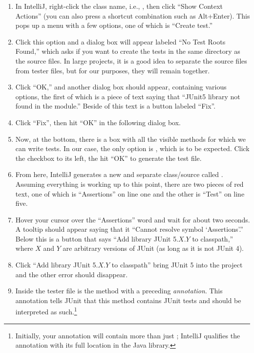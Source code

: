 \begin{enumerate}[label=(\arabic*)]
  \item In IntelliJ, right-click the class name, i.e., , then click ``Show Context Actions'' (you can also press a shortcut combination such as Alt+Enter). 
This pops up a menu with a few options, one of which is ``Create test.''
  \item Click this option and a dialog box will appear labeled ``No Test Roots Found,'' which asks if you want to create the tests in the same directory as the source files. 
In large projects, it is a good idea to separate the source files from tester files, but for our purposes, they will remain together. 
  \item Click ``OK,'' and another dialog box should appear, containing various options, the first of which is a piece of text saying that ``JUnit5 library not found in the module.'' Beside of this text is a button labeled ``Fix''. 
  \item Click ``Fix'', then hit ``OK'' in the following dialog box. 
  \item Now, at the bottom, there is a box with all the visible methods for which we can write tests. In our case, the only option is , which is to be expected. Click the checkbox to its left, the hit ``OK'' to generate the test file.
  \item From here, IntelliJ generates a new and separate class/source called . 
Assuming everything is working up to this point, there are two pieces of red text, one of which is ``Assertions'' on line one and the other is ``Test'' on line five. 
  \item Hover your cursor over the ``Assertions'' word and wait for about two seconds. A tooltip should appear saying that it ``Cannot resolve symbol `Assertions'.'' Below this is a button that says ``Add library JUnit 5.$X$.$Y$ to classpath,'' where $X$ and $Y$ are arbitrary versions of JUnit (as long as it is not JUnit 4). 
  \item Click ``Add library JUnit 5.$X$.$Y$ to classpath'' bring JUnit 5 into the project and the other error should disappear.
  \item Inside the tester file is the  method with a preceding \emph{annotation}. This  annotation tells JUnit that this method contains JUnit tests and should be interpreted as such.\footnote{Initially, your annotation will contain more than just ; IntelliJ qualifies the annotation with its full location in the Java library.} 
\end{enumerate}
